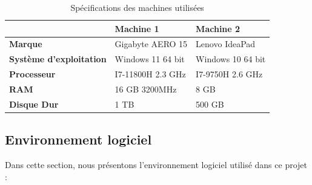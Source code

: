 \begin{table}[h!]
\centering
\caption{Spécifications des machines utilisées}
\label{tab:specs}
\begin{tabularx}{\linewidth}{|X|X|X|}
\hline
\textbf{} & \textbf{Machine 1} & \textbf{Machine 2} \\
\hline
\textbf{Marque} & Gigabyte AERO 15 & Lenovo IdeaPad \\
\hline
\textbf{Système d’exploitation} & Windows 11 64 bit & Windows 10 64 bit \\
\hline
\textbf{Processeur} & I7-11800H 2.3 GHz & I7-9750H 2.6 GHz \\
\hline
\textbf{RAM} & 16 GB 3200MHz & 8 GB \\
\hline
\textbf{Disque Dur} & 1 TB & 500 GB \\
\hline
\end{tabularx}
\end{table}
\newpage
\subsection{Environnement logiciel}
Dans cette section, nous présentons l’environnement logiciel utilisé dans ce projet :

